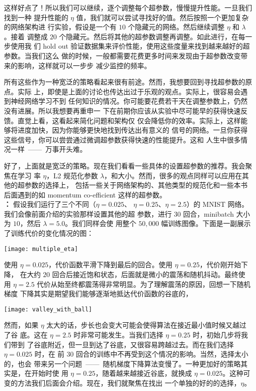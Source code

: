 这样好点了！所以我们可以继续，逐个调整每个超参数，慢慢提升性能。一旦我们找到一种
提升性能的 $\eta$ 值，我们就可以尝试寻找好的值。然后按照一个更加复杂的网络架构进
行实验，假设是一个有 $10$ 个隐藏元的网络。然后继续调整 $\eta$ 和 $\lambda$。接着
调整成 $20$ 个隐藏元。然后将其他的超参数调整再调整。如此进行，在每一步使用我
们 hold out 验证数据集来评价性能，使用这些度量来找到越来越好的超参数。当我们这么
做的时候，一般都需要花费更多时间来发现由于超参数改变带来的影响，这样就可以一步步
减少监控的频率。

所有这些作为一种宽泛的策略看起来很有前途。然而，我想要回到寻找超参数的原点。实际
上，即使是上面的讨论也传达出过于乐观的观点。实际上，很容易会遇到神经网络学习不到
任何知识的情况。你可能要花费若干天在调整参数上，仍然没有进展。所以我想要再重申一
下在前期你应该从实验中尽可能早的获得快速反馈。直觉上看，这看起来简化问题和架构仅
仅会降低你的效率。实际上，这样能够将进度加快，因为你能够更快地找到传达出有意义的
信号的网络。一旦你获得这些信号，你可以尝尝通过微调超参数获得快速的性能提升。这和
人生中很多情况一样~——~万事开头难。

好了，上面就是宽泛的策略。现在我们看看一些具体的设置超参数的推荐。我会聚焦在学习
率 $\eta$，L2 规范化参数
$\lambda$，和\minibatch{}大小。然而，很多的观点同样可以应用在其他的超参数的选择上，
包括一些关于网络架构的、其他类型的规范化和一些本书后面遇到的如 momentum
co-efficient 这样的超参数。\\

\textbf{\learningrate{}：} 假设我们运行了三个不同\learningrate{}（$\eta=0.025$、
  $\eta=0.25$、$\eta=2.5$）的 MNIST 网络。我们会像前面介绍的实验那样设置其他的超
参数，进行 $30$ 回合，minibatch 大小为 $10$，然后 $\lambda = 5.0$。我们同样会使
用整个 $50,000$ 幅训练图像。下面是一副展示了训练代价的变化情况的图：
\begin{center}
  \texttt{[image: multiple\_eta]}
\end{center}

使用 $\eta=0.025$，代价函数平滑下降到最后的回合。使用 $\eta=0.25$，代价刚开始下降，
在大约 $20$ 回合后接近饱和状态，后面就是微小的震荡和随机抖动。最终使
用 $\eta=2.5$ 代价从始至终都震荡得非常明显。为了理解震荡的原因，回想一下随机梯度
下降其实是期望我们能够逐渐地抵达代价函数的谷底的，
\begin{center}
  \texttt{[image: valley\_with\_ball]}
\end{center}
然而，如果 $\eta$ 太大的话，步长也会变大可能会使得算法在接近最小值时候又越过了谷
底。这在 $\eta=2.5$ 时非常可能发生。当我们选择 $\eta=0.25$ 时，初始几步将我们带到
了谷底附近，但一旦到达了谷底，又很容易跨越过去。而在我们选择 $\eta=0.025$ 时，在
前 $30$ 回合的训练中不再受到这个情况的影响。当然，选择太小的\learningrate{}，也会
带来另一个问题~——~随机梯度下降算法变慢了。一种更加好的策略其实是，在开始时使
用 $\eta=0.25$，随着越来越接近谷底，就换成
$\eta=0.025$。这种可变\learningrate{}的方法我们后面会介绍。现在，我们就聚焦在找出
一个单独的好的\learningrate{}的选择，$\eta$。

